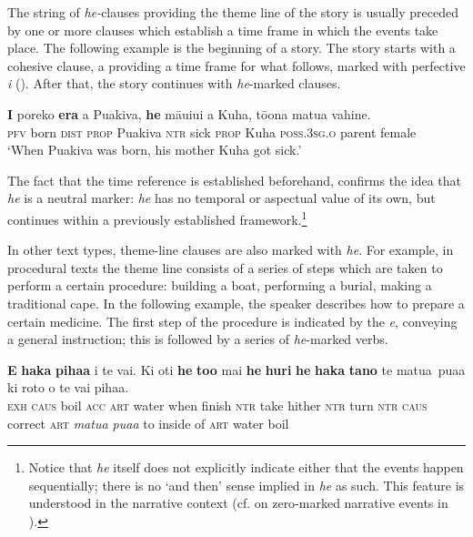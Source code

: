 The string of \textit{he-}clauses providing the theme line of the story is usually preceded by one or more clauses which establish a time frame in which the events take place. The following example is the beginning of a story. The story starts with a cohesive clause, a  providing a time frame for what follows, marked with perfective \textit{i} (). After that, the story continues with \textit{he}{}-marked clauses.

\ea\label{ex:7.4}
\gll \textbf{I} poreko \textbf{era} a Puakiva, \textbf{he} māuiui a Kuha, tō{\ꞌ}ona matu{\ꞌ}a vahine. \\
\textsc{pfv} born \textsc{dist} \textsc{prop} Puakiva \textsc{ntr} sick \textsc{prop} Kuha \textsc{poss.3sg.o} parent female \\

\glt
‘When Puakiva was born, his mother Kuha got sick.’ \textstyleExampleref{[R229.001]} 
\z

The fact that the time reference is established beforehand, confirms the idea that \textit{he} is a neutral  marker: \textit{he} has no temporal or aspectual value of its own, but continues within a previously established framework.\footnote{\label{fn:316}Notice that \textit{he} itself does not explicitly indicate either that the events happen sequentially; there is no ‘and then’ sense implied in \textit{he} as such. This feature is understood in the narrative context (cf. \citealt[127]{Hooper1998} on zero-marked narrative events in ).}

In other text types, theme-line clauses are also marked with \textit{he}. For example, in procedural texts the theme line consists of a series of steps which are taken to perform a certain procedure: building a boat, performing a burial, making a traditional cape. In the following example, the speaker describes how to prepare a certain medicine. The first step of the procedure is indicated by the  \textit{e}, conveying a general instruction; this is followed by a series of \textit{he}{}-marked verbs.

\ea\label{ex:7.5}
\gll \textbf{E} \textbf{haka} \textbf{piha{\ꞌ}a} i te vai. Ki oti \textbf{he} \textbf{to{\ꞌ}o} mai \textbf{he} \textbf{huri}  \textbf{he} \textbf{haka} \textbf{tano} te matu{\ꞌ}a~pua{\ꞌ}a ki roto o te vai piha{\ꞌ}a.\\
\textsc{exh} \textsc{caus} boil \textsc{acc} \textsc{art} water when finish \textsc{ntr} take hither \textsc{ntr} turn  \textsc{ntr} \textsc{caus} correct \textsc{art} \textit{matu{\ꞌ}a pua{\ꞌ}a} to inside of \textsc{art} water boil\\

